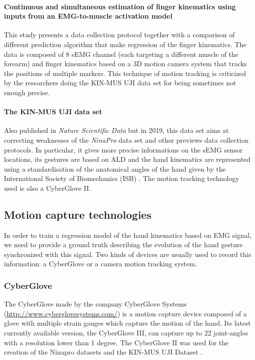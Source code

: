 \documentclass{article}
\begin{document}
\paragraph{Continuous and simultaneous estimation of finger kinematics using inputs from an EMG-to-muscle activation model \cite{ref:Ngeo2014}}

This study presents a data collection protocol together with a comparison of different prediction algorithm that make regression of the finger kinematics. The data is composed of 8 sEMG channel (each targeting a different muscle of the forearm) and finger kinematics based on a 3D motion camera system that tracks the positions of multiple markers. This technique of motion tracking is criticized by the researchers doing the KIN-MUS UJI data set for being sometimes not enough precise. 

\paragraph{The KIN-MUS UJI data set \cite{ref:KinMusUji}}

Also published in \textit{Nature Scientific Data} but in 2019, this data set aims at correcting weaknesses of the \textit{NinaPro} data set and other previews data collection protocols. In particular, it gives more precise informations on the sEMG sensor locations, its gestures are based on ALD and the hand kinematics are represented using a standardisation of the anatomical angles of the hand given by the International Society of Biomechanics (ISB) \cite{ref:handAnatomicalAngles}. The motion tracking technology used is also a CyberGlove II.


\subsection{Motion capture technologies \label{sec:motionCaptureTech}}

In order to train a regression model of the hand kinematics based on EMG signal, we need to provide a ground truth describing the evolution of the hand gesture synchronized with this signal.
Two kinds of devices are usually used to record this information: a CyberGlove or a camera motion tracking system. 

\subsubsection{CyberGlove}

The CyberGlove made by the company CyberGlove Systems (\url{http://www.cyberglovesystems.com/}) is a motion capture device composed of a glove with multiple strain gauges which capture the motion of the hand. Its latest currently available version, the CyberGlove III, can capture up to 22 joint-angles with a resolution lower than 1 degree. The  CyberGlove II was used for the creation of the Ninapro datasets \cite{ref:ninapro, ref:comp6EMGsetup} and the KIN-MUS UJI Dataset \cite{ref:KinMusUji}.
\end{document}
